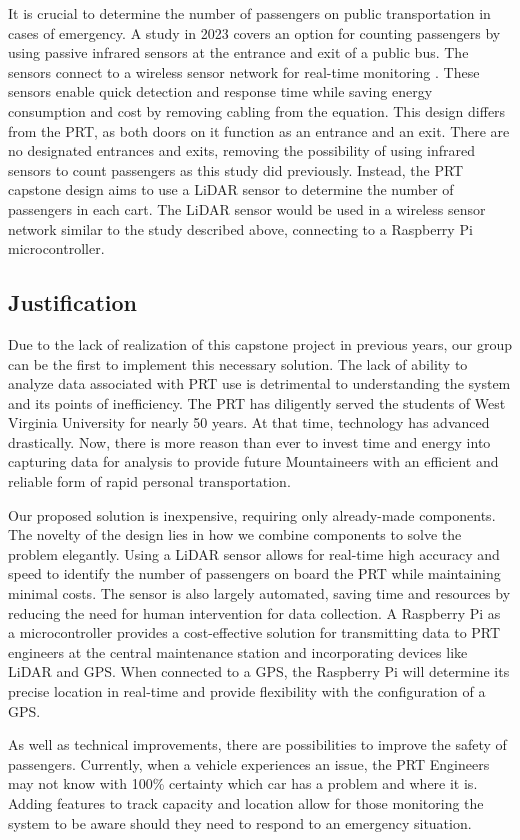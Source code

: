 It is crucial to determine the number of passengers on public transportation in cases of emergency. A study in 2023 covers an option for counting passengers by using passive infrared sensors at the entrance and exit of a public bus. The sensors connect to a wireless sensor network for real-time monitoring \cite{Jurak_Osman_Sikirić_Šimunović_2023}. These sensors enable quick detection and response time while saving energy consumption and cost by removing cabling from the equation. This design differs from the PRT, as both doors on it function as an entrance and an exit. There are no designated entrances and exits, removing the possibility of using infrared sensors to count passengers as this study did previously. Instead, the PRT capstone design aims to use a LiDAR sensor to determine the number of passengers in each cart. The LiDAR sensor would be used in a wireless sensor network similar to the study described above, connecting to a Raspberry Pi microcontroller.

\subsection{Justification}
Due to the lack of realization of this capstone project in previous years, our group can be the first to implement this necessary solution. The lack of ability to analyze data associated with PRT use is detrimental to understanding the system and its points of inefficiency. The PRT has diligently served the students of West Virginia University for nearly 50 years. At that time, technology has advanced drastically. Now, there is more reason than ever to invest time and energy into capturing data for analysis to provide future Mountaineers with an efficient and reliable form of rapid personal transportation.

Our proposed solution is inexpensive, requiring only already-made components. The novelty of the design lies in how we combine components to solve the problem elegantly. Using a LiDAR sensor allows for real-time high accuracy and speed to identify the number of passengers on board the PRT while maintaining minimal costs. The sensor is also largely automated, saving time and resources by reducing the need for human intervention for data collection. A Raspberry Pi as a microcontroller provides a cost-effective solution for transmitting data to PRT engineers at the central maintenance station and incorporating devices like LiDAR and GPS. When connected to a GPS, the Raspberry Pi will determine its precise location in real-time and provide flexibility with the configuration of a GPS.

As well as technical improvements, there are possibilities to improve the safety of passengers. Currently, when a vehicle experiences an issue, the PRT Engineers may not know with 100\% certainty which car has a problem and where it is. Adding features to track capacity and location allow for those monitoring the system to be aware should they need to respond to an emergency situation.

